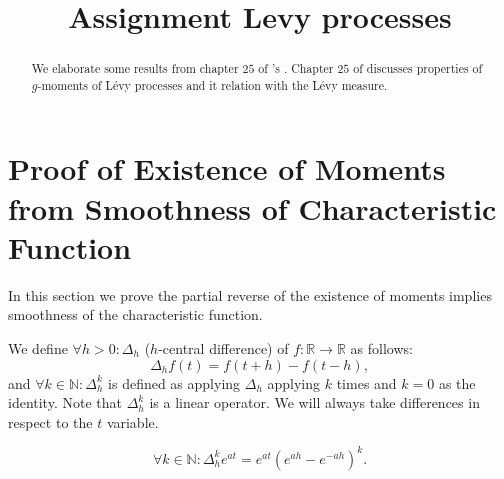 \documentclass[a4paper,11pt]{article}
\title{Assignment Levy processes}
\author{}
\date{}
\begin{document}
\maketitle

\begin{abstract}
    We elaborate some results from chapter $25$ of \citeauthor{sato_levy_2013}'s  \cite{sato_levy_2013}. Chapter $25$ of \cite{sato_levy_2013} discusses properties of $g$-moments of Lévy processes and it relation with the Lévy measure.
\end{abstract}

\section{Proof of Existence of Moments from Smoothness of Characteristic Function}

In this section we prove the partial reverse of the existence of moments implies smoothness of the characteristic function.

\begin{definition}[$\Delta^{k}_{h}$]
    We define $\forall h>0: \Delta_{h}$ ($h$-central difference) of $f:\mathbb{R}\rightarrow \mathbb{R}$ as follows:
    \begin{equation}
        \Delta_{h} f(t) = f(t+h)- f(t-h),
    \end{equation}
    and $\forall k \in \mathbb{N}:\Delta^{k}_{h}$ is defined as applying $\Delta_{h}$ applying $k$ times and
    $k=0$ as the identity. Note that $\Delta^{k}_{h}$ is a linear operator. We will always take
    differences in respect to the $t$ variable.
\end{definition}

\begin{lemma}[$\Delta^{k}_{h} e^{at}$]
    \begin{equation}
        \forall k \in \mathbb{N}: \Delta^{k}_{h} e^{at} =  e^{at} \left( e^{ah} - e^{-ah} \right)^{k}.
    \end{equation}
\end{lemma}
\end{document}
